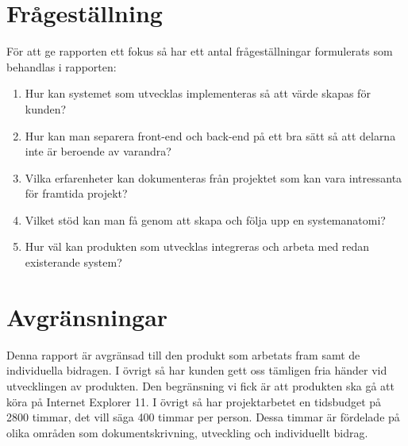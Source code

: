 \section{Frågeställning}
För att ge rapporten ett fokus så har ett antal frågeställningar formulerats som behandlas i rapporten:
\begin{enumerate}
	\item Hur kan systemet som utvecklas implementeras så att värde skapas för kunden?
	\item Hur kan man separera front-end och back-end på ett bra sätt så att delarna inte är beroende av varandra?
	\item Vilka erfarenheter kan dokumenteras från projektet som kan vara intressanta för framtida projekt?
	\item Vilket stöd kan man få genom att skapa och följa upp en systemanatomi?
	\item Hur väl kan produkten som utvecklas integreras och arbeta med redan existerande system?
\end{enumerate}

\section{Avgränsningar}
Denna rapport är avgränsad till den produkt som arbetats fram samt de individuella bidragen. I övrigt så har kunden gett oss tämligen fria händer vid utvecklingen av produkten. Den begränsning vi fick är att produkten ska gå att köra på Internet Explorer 11.
I övrigt så har projektarbetet en tidsbudget på 2800 timmar, det vill säga 400 timmar per person. Dessa timmar är fördelade på olika områden som dokumentskrivning, utveckling och individuellt bidrag.

\newpage
